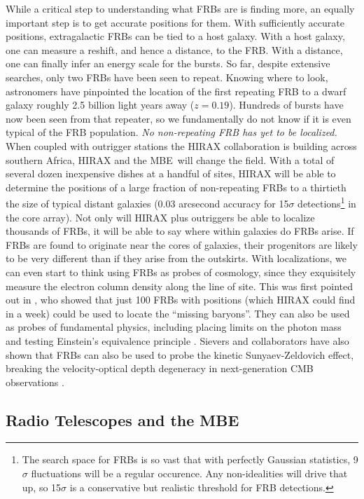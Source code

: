 \documentclass[letterpaper,11pt,preprint]{aastex}
\newcommand{\mbe}{{\rm MBE}}
\begin{document}
While a critical step to understanding what FRBs are is finding more,
an equally important step is to get accurate positions for them.  With
sufficiently accurate positions, extragalactic FRBs can be tied to a
host galaxy.  With a host galaxy, one can measure a reshift, and hence
a distance, to the FRB.  With a distance, one can finally infer an
energy scale for the bursts.  So far, despite extensive searches, only
two FRBs have been seen to repeat.  Knowing where to look, astronomers
have pinpointed the location of the first repeating FRB to a dwarf
galaxy roughly 2.5 billion light years away ($z=0.19$).  Hundreds of
bursts have now been seen from that repeater, so we fundamentally do
not know if it is even typical of the FRB population.  {\textit{No
    non-repeating FRB has yet to be localized.}}  When coupled with
outrigger stations the HIRAX collaboration is building across southern
Africa, HIRAX and the \mbe\ will change the field.  With a total of
several dozen inexpensive dishes at a handful of sites, HIRAX will be
able to determine the positions of a large fraction of non-repeating
FRBs to a thirtieth the size of typical distant galaxies (0.03
arcsecond accuracy for 15$\sigma$ detections\footnote{The search space
  for FRBs is so vast that with perfectly Gaussian statistics,
  9$\sigma$ fluctuations will be a regular occurence.  Any
  non-idealities will drive that up, so 15$\sigma$ is a conservative
  but realistic threshold for FRB detections.} in the core array).
Not only will HIRAX plus outriggers be able to localize thousands of
FRBs, it will be able to say where within galaxies do FRBs arise.  If
FRBs are found to originate near the cores of galaxies, their
progenitors are likely to be very different than if they arise from
the outskirts.  With localizations, we can even start to think using
FRBs as probes of cosmology, since they exquisitely measure the
electron column density along the line of site. This was first pointed
out in \citet{McQuinn2014}, who showed that just 100 FRBs with
positions (which HIRAX could find in a week) could be used to locate
the ``missing baryons''.  They can also be used as probes of
fundamental physics, including placing limits on the photon mass
\citep{bonetti2017} and testing Einstein's equivalence principle
\citep{frb_equivalence}.  Sievers and collaborators have also shown
that FRBs can also be used to probe the kinetic Sunyaev-Zeldovich
effect, breaking the velocity-optical depth degeneracy in
next-generation CMB observations \citep{Madhavacheril18}.

\subsection{Radio Telescopes and the \mbe}
\end{document}
